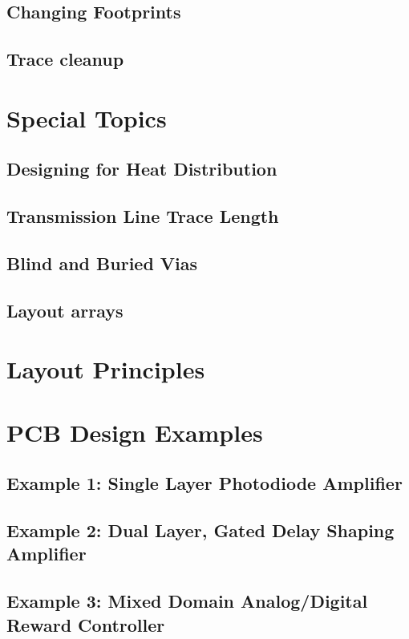 \subsection{Changing Footprints}
\subsection{Trace cleanup}

\section{Special Topics}
\subsection{Designing for Heat Distribution}
\subsection{Transmission Line Trace Length}
\subsection{Blind and Buried Vias}
\subsection{Layout arrays}

\section{Layout Principles}

\section{PCB Design Examples}
\subsection{Example 1: Single Layer Photodiode Amplifier}
\subsection{Example 2: Dual Layer, Gated Delay Shaping Amplifier}
\subsection{Example 3: Mixed Domain Analog/Digital Reward Controller}
